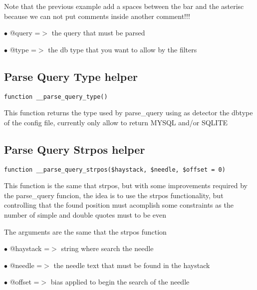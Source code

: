 \documentclass[a4paper]{book}
\begin{document}
Note that the previous example add a spaces between the bar and the asterisc
because we can not put comments inside another comment!!!

\begin{compactitem}
\item[\color{myblue}$\bullet$] @query =$>$ the query that must be parsed
\item[\color{myblue}$\bullet$] @type  =$>$ the db type that you want to allow by the filters
\end{compactitem}

\hypertarget{toc242}{}
\subsection{Parse Query Type helper}

\begin{lstlisting}
function __parse_query_type()
\end{lstlisting}

This function returns the type used by parse\_query using as detector the
dbtype of the config file, currently only allow to return MYSQL and/or SQLITE

\hypertarget{toc243}{}
\subsection{Parse Query Strpos helper}

\begin{lstlisting}
function __parse_query_strpos($haystack, $needle, $offset = 0)
\end{lstlisting}

This function is the same that strpos, but with some improvements required
by the parse\_query funcion, the idea is to use the strpos functionality, but
controlling that the found position must acomplish some constraints as the
number of simple and double quotes must to be even

The arguments are the same that the strpos function

\begin{compactitem}
\item[\color{myblue}$\bullet$] @haystack =$>$ string where search the needle
\item[\color{myblue}$\bullet$] @needle   =$>$ the needle text that must be found in the haystack
\item[\color{myblue}$\bullet$] @offset   =$>$ bias applied to begin the search of the needle
\end{compactitem}
\end{document}
